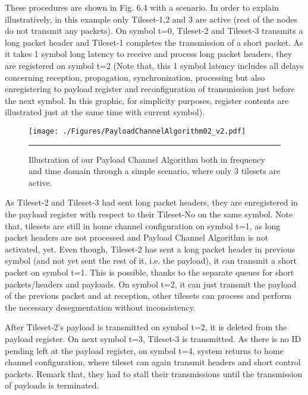These procedures are shown in Fig. 6.4 with a scenario. In order to explain illustratively, in this example only Tileset-1,2 and 3 are active (rest of the nodes do not transmit any packets). On symbol t=0, Tileset-2 and Tileset-3 transmits a long packet header and Tileset-1 completes the transmission of a short packet. As it takes 1 symbol long latency to receive and process long packet headers, they are registered on symbol t=2 (Note that, this 1 symbol latency includes all delays concerning reception, propagation, synchronization, processing but also enregistering to payload register and reconfiguration of transmission just before the next symbol. In this graphic, for simplicity purposes, register contents are illustrated just at the same time with current symbol). 


\begin{figure}[htbp]
  \centering
    \texttt{[image: ./Figures/PayloadChannelAlgorithm02\_v2.pdf]}
    \rule{35em}{0.5pt}
  \caption[Payload Channel Algorithm Illustration]{Illustration of our Payload Channel Algorithm both in frequency and time domain through a simple scenario, where only 3 tilesets are active.}
  \label{fig:Electron}
\end{figure}


As Tileset-2 and Tileset-3 had sent long packet headers, they are enregistered in the payload register with respect to their Tileset-No on the same symbol. Note that, tilesets are still in home channel configuration on symbol t=1, as long packet headers are not processed and Payload Channel Algorithm is not activated, yet. Even though, Tileset-2 has sent a long packet header in previous symbol (and not yet sent the rest of it, i.e. the payload), it can transmit a short packet on symbol t=1. This is possible, thanks to the separate queues for short packets/headers and payloads. On symbol t=2, it can just transmit the payload of the previous packet and at reception, other tilesets can process and perform the necessary desegmentation without inconsistency. 

After Tileset-2's payload is transmitted on symbol t=2, it is deleted from the payload register. On next symbol t=3, Tileset-3 is transmitted. As there is no ID pending left at the payload register, on symbol t=4, system returns to home channel configuration, where tileset can again transmit headers and short control packets. Remark that, they had to stall their transmissions until the transmission of payloads is terminated.

